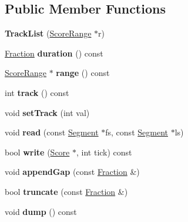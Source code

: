 \subsection*{Public Member Functions}
\begin{DoxyCompactItemize}
\item 
\mbox{\label{class_ms_1_1_track_list_a16605575a0a7f36b35644564f1b9ba64}} 
{\bfseries Track\+List} (\hyperlink{class_ms_1_1_score_range}{Score\+Range} $\ast$r)
\item 
\mbox{\label{class_ms_1_1_track_list_a057a83235f9cb57ec6855e417e6af7d5}} 
\hyperlink{class_ms_1_1_fraction}{Fraction} {\bfseries duration} () const
\item 
\mbox{\label{class_ms_1_1_track_list_a7fb653b8b7a1e5c461b809c19ce86315}} 
\hyperlink{class_ms_1_1_score_range}{Score\+Range} $\ast$ {\bfseries range} () const
\item 
\mbox{\label{class_ms_1_1_track_list_a8e78cf83470680327459a32d9489bba8}} 
int {\bfseries track} () const
\item 
\mbox{\label{class_ms_1_1_track_list_afbe0fca3082eb5f3c2feb5dc94fc5606}} 
void {\bfseries set\+Track} (int val)
\item 
\mbox{\label{class_ms_1_1_track_list_ac7ef7280b312b54e3cbcc36ec8b70ab9}} 
void {\bfseries read} (const \hyperlink{class_ms_1_1_segment}{Segment} $\ast$fs, const \hyperlink{class_ms_1_1_segment}{Segment} $\ast$ls)
\item 
\mbox{\label{class_ms_1_1_track_list_aa8354478340caddc5b689f81b7c56d61}} 
bool {\bfseries write} (\hyperlink{class_ms_1_1_score}{Score} $\ast$, int tick) const
\item 
\mbox{\label{class_ms_1_1_track_list_a05eb747fc82faded2710a673e79e0481}} 
void {\bfseries append\+Gap} (const \hyperlink{class_ms_1_1_fraction}{Fraction} \&)
\item 
\mbox{\label{class_ms_1_1_track_list_af60a02013ce74f108b528afc16d60341}} 
bool {\bfseries truncate} (const \hyperlink{class_ms_1_1_fraction}{Fraction} \&)
\item 
\mbox{\label{class_ms_1_1_track_list_af6ed76a59f90eda048de2e8839628b08}} 
void {\bfseries dump} () const
\end{DoxyCompactItemize}


